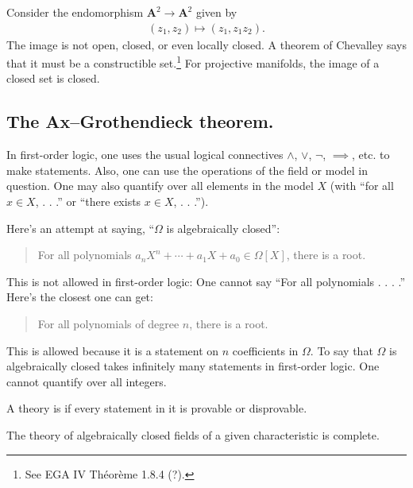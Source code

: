 \documentclass [11 pt, oneside] {article}
\begin{document}
\begin{example}\label{}
Consider the endomorphism $\mathbf{A}^2\longrightarrow \mathbf{A}^2$ given by
\begin{align*}
	(z_1,z_2)\longmapsto  (z_1,z_1z_2).
\end{align*}
The image is not open, closed, or even locally closed. A theorem of Chevalley says that it must be a constructible set.\footnote{See EGA IV Th\'eor\`eme 1.8.4 (?).} For projective manifolds, the image of a closed set is closed.
\end{example}

\subsection{The Ax--Grothendieck theorem.}
\begin{remark}
	 In first-order logic, one uses the usual logical connectives $\land$, $\lor$, $\lnot$, $\implies$, etc. to make statements. Also, one can use the operations of the field or model in question. One may also quantify over all elements in the model $X$ (with ``for all $x\in X$, . . .'' or ``there exists $x\in X$, . . .'').

	Here's an attempt at saying, ``$\Omega$ is algebraically closed'':
	\begin{quote}
		\small 
		For all polynomials $a_nX^n + \cdots + a_1X + a_0\in \Omega[X]$, there is a root.
	\end{quote}
	This is not allowed in first-order logic: One cannot say ``For all polynomials . . . .'' Here's the closest one can get:
	\begin{quote}
		\small 
		For all polynomials of degree $n$, there is a root.
	\end{quote}
	This is allowed because it is a statement on $n$ coefficients in $\Omega$. To say that $\Omega$ is algebraically closed takes infinitely many statements in first-order logic. One cannot quantify over all integers.
\end{remark}
\begin{definition}[ ]\label{}
A theory is  if every statement in it is provable or disprovable.
\end{definition}

\begin{proposition}[ ]\label{}
The theory of algebraically closed fields of a given characteristic is complete.
\end{proposition}
\end{document}
